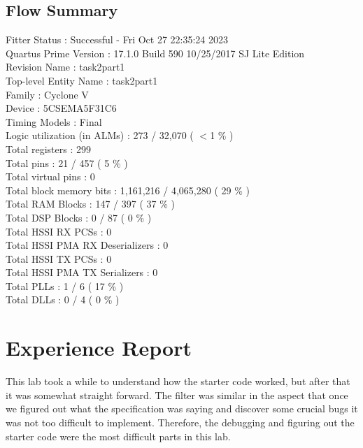 \documentclass[11pt, titlepage]{article}
\begin{document}
        \subsection{Flow Summary}
            Fitter Status : Successful - Fri Oct 27 22:35:24 2023 \\
            Quartus Prime Version : 17.1.0 Build 590 10/25/2017 SJ Lite Edition \\
            Revision Name : task2part1\\ 
            Top-level Entity Name : task2part1\\ 
            Family : Cyclone V\\ 
            Device : 5CSEMA5F31C6\\
            Timing Models : Final\\ 
            Logic utilization (in ALMs) : 273 / 32,070 ( $< $1 \% )\\ 
            Total registers : 299\\
            Total pins : 21 / 457 ( 5 \% )\\
            Total virtual pins : 0\\
            Total block memory bits : 1,161,216 / 4,065,280 ( 29 \% )\\
            Total RAM Blocks : 147 / 397 ( 37 \% )\\
            Total DSP Blocks : 0 / 87 ( 0 \% )\\
            Total HSSI RX PCSs : 0\\
            Total HSSI PMA RX Deserializers : 0\\
            Total HSSI TX PCSs : 0\\
            Total HSSI PMA TX Serializers : 0\\
            Total PLLs : 1 / 6 ( 17 \% )\\
            Total DLLs : 0 / 4 ( 0 \% )\\
            
    \section{Experience Report}
        This lab took a while to understand how the starter code worked, but after that it was somewhat straight forward. The filter was similar in the aspect that once we figured out what the specification was saying  and discover some crucial bugs it was not too difficult to implement. Therefore, the debugging and figuring out the starter code were the most difficult parts in this lab.
\end{document}
